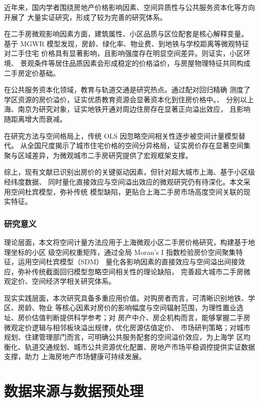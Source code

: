 \documentclass[UTF8]{ctexart}
\begin{document}
近年来，国内学者围绕房地产价格影响因素、空间异质性与公共服务资本化等方向开展了
大量实证研究，形成了较为完善的研究体系。

在二手房微观影响因素方面，建筑属性、小区品质与区位配套是核心解释变量。\citet{shen2020}
基于 MGWR 模型发现，房龄、绿化率、物业费、到地铁与学校距离等微观特征对二手住宅
价格具有显著影响，且影响强度存在明显空间差异。\citet{wen2012}则证实，小区环境、
景观条件等居住品质因素会形成稳定的价格溢价，与房屋物理特征共同构成二手房定价基础。

在公共服务资本化领域，教育与轨道交通是研究热点。\citet{hu2014}通过配对回归精确
测度了学区资源的房价溢价，证实优质教育资源会显著资本化到住房价格中。\citet{fan2018}、
\citet{liu2015} 分别以上海、南京为研究对象，证实地铁开通对周边住房存在显著正向溢出效应，
且影响随距离增大而衰减。

在研究方法与空间格局上，传统 OLS 因忽略空间相关性逐步被空间计量模型替代。\citet{wang2013}
从全国尺度揭示了城市住宅价格的空间分异格局，证实房价存在显著空间集聚与区域差异，为微观城市二手房研究提供了宏观框架支撑。

综上，现有文献已识别出房价的关键驱动因素，但针对超大城市上海、基于小区级经纬度数据、
同时量化直接效应与空间溢出效应的微观研究仍有待深化。本文采用空间杜宾模型，弥补传统
模型缺陷，更贴合上海二手房市场高度空间关联的现实特征。



\subsubsection{研究意义}

理论层面，本文将空间计量方法应用于上海微观小区二手房价格研究，构建基于地理坐标的小区
级空间权重矩阵，通过全局 Moran's I 指数检验房价空间聚集特征，运用空间杜宾模型（SDM）
量化各影响因素的直接效应与空间溢出间接效应，弥补传统截面回归模型忽略空间相关性的理论缺陷，
完善超大城市二手房微观定价、空间经济学相关研究体系。

现实实践层面，本次研究具备多重应用价值。对购房者而言，可清晰识别地铁、学区、房龄、物业
等核心因素对房价的影响幅度与空间辐射范围，为理性置业选址、房价估值判断提供科学参考；对
房产中介、房企机构而言，能够掌握二手房微观定价逻辑与相邻板块溢出规律，优化房源估值定价、
市场研判策略；对城市规划、住建管理部门而言，可明确公共服务配套的空间溢价效应，为上海学
区均衡化、轨道交通规划、城市公共资源优化配置、房地产市场平稳调控提供实证数据支撑，助力
上海房地产市场健康可持续发展。

\section{数据来源与数据预处理}
\end{document}
